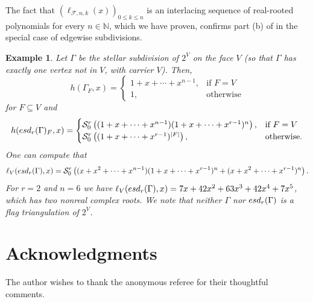 \documentclass[11pt]{amsart}
\newtheorem{example}[theorem]{Example}
\newcommand{\esd}{{\rm esd}}
\newcommand{\fF}{{\mathcal F}}
\newcommand{\sS}{{\mathcal S}}
\newcommand{\NN}{{\mathbb N}}
\begin{document}
The fact that $(\ell_{\fF,n,k}(x))_{0 \le k \le n}$ 
is an interlacing sequence of real-rooted polynomials
for every $n \in \NN$, which we have proven, confirms 
part (b) of \cite[Conjecture~7.1]{Ath23+} in the 
special case of edgewise subdivisions.
%
\begin{example} \label{ex:esdr} \rm
Let $\Gamma$ be the stellar subdivision of $2^V$
on the face $V$ (so that $\Gamma$ has exactly 
one vertex not in $V$, with carrier $V$). Then,
%
\[ h(\Gamma_F, x) = \begin{cases}
   1 + x + \cdots + x^{n-1}, & \text{if $F = V$} \\
   1, & \text{otherwise} \end{cases} \]
%
for $F \subseteq V$ and
%
\[ h(\esd_r(\Gamma)_F, x) = \begin{cases}
   \sS^r_0 \left( (1 + x + \cdots + x^{n-1})
	 (1 + x + \cdots + x^{r-1})^n \right), & 
	          \text{if $F = V$} \\ 
	 \sS^r_0 \left( (1 + x + \cdots + x^{r-1})^{|F|}
	 \right), & \text{otherwise.} \end{cases} \]
%
One can compute that 
%
\[ \ell_V(\esd_r(\Gamma),x) = \sS^r_0 \left( 
   (x + x^2 + \cdots + x^{n-1}) 
	 (1 + x + \cdots + x^{r-1})^n + 
	 (x + x^2 + \cdots + x^{r-1})^n \right). \]
% 
For $r=2$ and $n=6$ we have 
$\ell_V(\esd_r(\Gamma),x) = 7x + 42x^2 + 63x^3 + 
42x^4 + 7x^5$, which has two nonreal complex 
roots. We note that neither $\Gamma$ nor 
$\esd_r(\Gamma)$ is a flag triangulation of 
$2^V$.
\end{example}

\section*{Acknowledgments}

The author wishes to thank the anonymous referee 
for their thoughtful comments.
\end{document}
